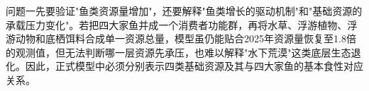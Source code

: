 问题一先要验证"鱼类资源量增加"，还要解释"鱼类增长的驱动机制"和"基础资源的承载压力变化"。若把四大家鱼并成一个消费者功能群，再将水草、浮游植物、浮游动物和底栖饵料合成单一资源总量，模型虽仍能贴合2025年资源量恢复至1.8倍的观测值，但无法判断哪一层资源先承压，也难以解释"水下荒漠"这类底层生态退化。因此，正式模型中必须分别表示四类基础资源及其与四大家鱼的基本食性对应关系。
